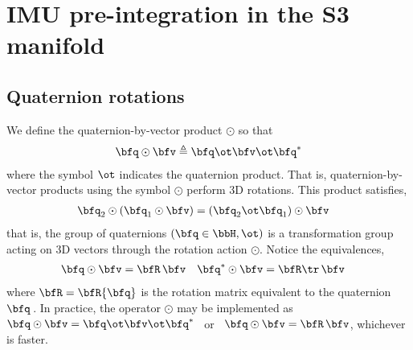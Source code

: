 

\newcommand{\bw}{{\bfomega}}
\newcommand{\bth}{{\bftheta}}
\newcommand{\bphi}{{\bfphi}}
\newcommand{\nth}{\norm{\bth}}
\newcommand{\ab}{{\bfa_b}}
\newcommand{\wb}{{\bw_b}}
\newcommand{\D}{\Delta}
\newcommand{\Dzero}{{\D^0}}
\newcommand{\Dp}{{\D\bfp}}
\newcommand{\Dv}{{\D\bfv}}
\newcommand{\Dth}{{\D\bth}}
\newcommand{\Dq}{{\D\bfq}}
\newcommand{\DR}{{\D\bfR}}
\newcommand{\DP}{{\D\bfP}}
\newcommand{\DV}{{\D\bfV}}
\newcommand{\DTH}{{\D\bfTheta}}
\newcommand{\Dw}{{\D\bw}}
\newcommand{\DW}{{\D\bfOmega}}
\newcommand{\dpp}{{\delta\bfp}}
\newcommand{\dv}{{\delta\bfv}}
\newcommand{\dth}{{\delta\bth}}
\newcommand{\dq}{{\delta\bfq}}
\newcommand{\dR}{{\delta\bfR}}
\newcommand{\dP}{{\delta\bfP}}
\newcommand{\dV}{{\delta\bfV}}
\newcommand{\dTH}{{\delta\bfTheta}}
\newcommand{\dw}{{\delta\bw}}

\newcommand{\te}{\triangleq}
\newcommand{\od}{\odot}

\newcommand{\tcom}[1]{{\footnotesize/\texttt{#1}/} }
\newcommand{\com}[1]{{\footnotesize/\texttt{#1}/~} }
\newcommand{\cdef}{\com{def}}
\newcommand{\cchain}{\com{chain}}
\newcommand{\ccross}{\com{cross}}
\newcommand{\cJr}{\com{Jr}}
\newcommand{\csmall}{\com{small}}
\newcommand{\cswap}{\com{swap}}
\newcommand{\ctrans}{\com{trans}}
\newcommand{\clog}{\com{Log}}
\newcommand{\clim}{\com{lim}}
\newcommand{\ccancel}{\com{cancel}}
\newcommand{\cexpand}{\com{expand}}
\newcommand{\csubst}{\com{subst}}

\section{IMU pre-integration in the S3 manifold}
\subsection{Quaternion rotations}

We define the quaternion-by-vector product $\od$ so that
%
\begin{align}
\bfq\od\bfv \te \bfq\ot\bfv\ot\bfq^*
\end{align}
%
where the symbol $\ot$ indicates the quaternion product.
That is, quaternion-by-vector products using the symbol $\od$ perform 3D rotations. This product satisfies,
%
\begin{align*}
\bfq_2\od(\bfq_1\od\bfv) &= (\bfq_2\ot\bfq_1)\od\bfv
\end{align*}
%
that is, the group of quaternions $(\bfq\in\bbH,\ot)$ is a transformation group acting on 3D vectors through the rotation action $\od$.
Notice the equivalences,
%
\begin{align*}
\bfq\od\bfv &= \bfR\,\bfv
&
\bfq^*\od\bfv &= \bfR\tr\,\bfv
\end{align*}
%
where $\bfR=\bfR\{\bfq\}$ is the rotation matrix equivalent to the quaternion $\bfq$\,. In practice, the operator $\od$ may be implemented as ~$\bfq\od\bfv = \bfq\ot\bfv\ot\bfq^*$ ~or~ $\bfq\od\bfv = \bfR\,\bfv$, whichever is faster.

